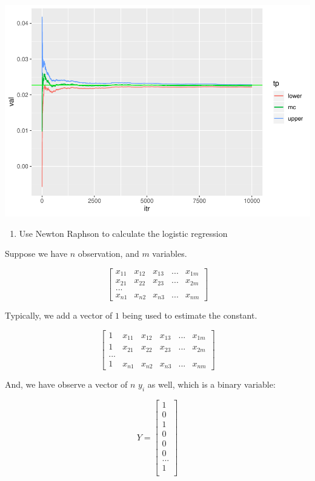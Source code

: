 \documentclass[]{book}
\providecommand{\tightlist}{%
  \setlength{\itemsep}{0pt}\setlength{\parskip}{0pt}}
\begin{document}
\includegraphics{bookdown-demo_files/figure-latex/unnamed-chunk-18-1.pdf}

\begin{enumerate}
\def\labelenumi{\arabic{enumi}.}
\setcounter{enumi}{1}
\tightlist
\item
  Use Newton Raphson to calculate the logistic regression
\end{enumerate}

Suppose we have \(n\) observation, and \(m\) variables.

\[\begin{bmatrix}
x_{11} & x_{12} & x_{13} & ... & x_{1m}\\
x_{21} & x_{22} & x_{23} & ... & x_{2m} \\
...\\
x_{n1} & x_{n2} & x_{n3} & ... & x_{nm}
\end{bmatrix}\]

Typically, we add a vector of \(1\) being used to estimate the constant.

\[\begin{bmatrix}
1 & x_{11} & x_{12} & x_{13} & ... & x_{1m}\\
1 & x_{21} & x_{22} & x_{23} & ... & x_{2m} \\
...\\
1 & x_{n1} & x_{n2} & x_{n3} & ... & x_{nm}
\end{bmatrix}\]

And, we have observe a vector of \(n\) \(y_i\) as well, which is a
binary variable:

\[Y = \begin{bmatrix}1 \\
0 \\
1 \\
0 \\
0 \\
0 \\
...\\
1 \\
\end{bmatrix}\]
\end{document}
